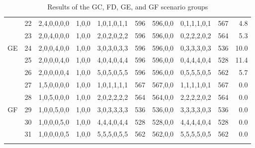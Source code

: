 \documentclass[review,12pt, 3p, times]{elsarticle}
\begin{document}
\begin{longtable}{|c|c|c|c|c|c|c|c|c|r|}
	\hline
	        & 22      & 2,4,0,0,0,0                         & 1,0,0                                & 1,0,1,0,1,1          & 596          & 596,0,0               & 0,1,1,1,0,1                                & 567                     & 4.8        \\
	        & 23      & 2,0,4,0,0,0                         & 1,0,0                                & 2,0,2,0,2,2          & 596          & 596,0,0               & 0,2,2,2,0,2                                & 564                     & 5.3        \\
	GE      & 24      & 2,0,0,4,0,0                         & 1,0,0                                & 3,0,3,0,3,3          & 596          & 596,0,0               & 0,3,3,3,0,3                                & 536                     & 10.0       \\
	        & 25      & 2,0,0,0,4,0                         & 1,0,0                                & 4,0,4,0,4,4          & 596          & 596,0,0               & 0,4,4,4,0,4                                & 528                     & 11.4       \\
	        & 26      & 2,0,0,0,0,4                         & 1,0,0                                & 5,0,5,0,5,5          & 596          & 596,0,0               & 0,5,5,5,0,5                                & 562                     & 5.7        \\
	\hline
	        & 27      & 1,5,0,0,0,0                         & 1,0,0                                & 1,0,1,1,1,1          & 567          & 567,0,0               & 1,1,1,1,0,1                                & 567                     & 0.0        \\
	        & 28      & 1,0,5,0,0,0                         & 1,0,0                                & 2,0,2,2,2,2          & 564          & 564,0,0               & 2,2,2,2,0,2                                & 564                     & 0.0        \\
	GF      & 29      & 1,0,0,5,0,0                         & 1,0,0                                & 3,0,3,3,3,3          & 536          & 536,0,0               & 3,3,3,3,0,3                                & 536                     & 0.0        \\
	        & 30      & 1,0,0,0,5,0                         & 1,0,0                                & 4,4,4,0,4,4          & 528          & 528,0,0               & 4,4,4,4,0,4                                & 528                     & 0.0        \\
	        & 31      & 1,0,0,0,0,5                         & 1,0,0                                & 5,5,5,0,5,5          & 562          & 562,0,0               & 5,5,5,5,0,5                                & 562                     & 0.0        \\
	\hline
	\caption{Results of the GC, FD, GE, and GF scenario groups} 				
	\label{tab:tr_gcdef}
\end{longtable}
					
\end{document}
